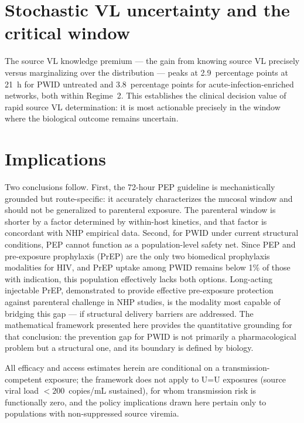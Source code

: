 \documentclass[10pt,letterpaper]{article}
\theoremstyle{definition}
\theoremstyle{remark}
\begin{document}
\section*{Stochastic VL uncertainty and the critical window}

The source VL knowledge premium --- the gain from knowing source VL precisely versus marginalizing over the distribution --- peaks at 2.9~percentage points at 21~h for PWID untreated and 3.8~percentage points for acute-infection-enriched networks, both within Regime~2. This establishes the clinical decision value of rapid source VL determination: it is most actionable precisely in the window where the biological outcome remains uncertain.

\section*{Implications}

Two conclusions follow. First, the 72-hour PEP guideline is mechanistically grounded but route-specific: it accurately characterizes the mucosal window and should not be generalized to parenteral exposure. The parenteral window is shorter by a factor determined by within-host kinetics, and that factor is concordant with NHP empirical data. Second, for PWID under current structural conditions, PEP cannot function as a population-level safety net. Since PEP and pre-exposure prophylaxis (PrEP) are the only two biomedical prophylaxis modalities for HIV\cite{grant2010,anderson2012}, and PrEP uptake among PWID remains below 1\% of those with indication\cite{baugher2025}, this population effectively lacks both options. Long-acting injectable PrEP, demonstrated to provide effective pre-exposure protection against parenteral challenge in NHP studies\cite{swanstrom2023,vidal2022}, is the modality most capable of bridging this gap --- if structural delivery barriers are addressed\cite{demidont2026}. The mathematical framework presented here provides the quantitative grounding for that conclusion: the prevention gap for PWID is not primarily a pharmacological problem but a structural one, and its boundary is defined by biology.

All efficacy and access estimates herein are conditional on a transmission-competent exposure; the framework does not apply to U=U exposures (source viral load $<200$~copies/mL sustained), for whom transmission risk is functionally zero, and the policy implications drawn here pertain only to populations with non-suppressed source viremia.
\end{document}
